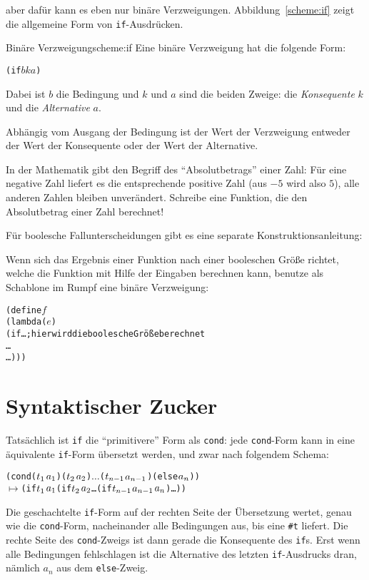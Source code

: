 aber dafür kann es eben nur binäre Verzweigungen.
Abbildung~\ref{scheme:if} zeigt die allgemeine Form von
\texttt{if}-Ausdrücken.
\begin{feature}{Binäre Verzweigung}{scheme:if}
  Eine binäre Verzweigung hat die folgende Form:
\begin{alltt}
(if \(b\) \(k\) \(a\))
\end{alltt}
Dabei ist $b$ die Bedingung und $k$ und $a$ sind die
beiden Zweige: die \textit{Konsequente} $k$ und die
\textit{Alternative} $a$.

Abhängig vom Ausgang der
Bedingung ist der Wert der Verzweigung entweder der Wert der Konsequente
oder der Wert der Alternative.
\end{feature}
%
\begin{aufgabe}
  In der Mathematik gibt den Begriff des "`Absolutbetrags"' einer
  Zahl: Für eine negative Zahl liefert es die entsprechende positive
  Zahl (aus $-5$ wird also $5$), alle anderen Zahlen bleiben
  unverändert.  Schreibe eine Funktion, die den Absolutbetrag einer
  Zahl berechnet!
\end{aufgabe}
%
Für boolesche Fallunterscheidungen gibt es eine separate
Konstruktionsanleitung:
%
\begin{konstruktionsanleitung}
  Wenn sich das Ergebnis einer Funktion nach einer booleschen Größe
  richtet, welche die Funktion mit Hilfe der Eingaben berechnen kann,
  benutze als Schablone im Rumpf eine binäre Verzweigung:
\begin{alltt}
(define \(f\)
  (lambda (\(e\))
    (if \ldots ; \textrm{hier wird die boolesche Größe berechnet}
        \ldots
        \ldots)))
\end{alltt}
\end{konstruktionsanleitung}

\section{Syntaktischer Zucker}

Tatsächlich ist \texttt{if} die "`primitivere"' Form als
\texttt{cond}: jede \texttt{cond}-Form kann in eine äquivalente
\texttt{if}-Form übersetzt werden, und zwar nach
folgendem Schema:
%
\begin{alltt}
(cond (\(t\sb{1}\) \(a\sb{1}\)) (\(t\sb{2}\) \(a\sb{2}\)) \(\ldots\) (\(t\sb{n-1}\) \(a\sb{n-1}\)) (else \(a\sb{n}\)))
  \(\mapsto\) (if \(t\sb{1}\) \(a\sb{1}\) (if \(t\sb{2}\) \(a\sb{2}\) \ldots (if \(t\sb{n-1}\) \(a\sb{n-1}\) \(a\sb{n}\))\ldots))
\end{alltt}
%
Die geschachtelte \texttt{if}-Form auf der rechten Seite der
Übersetzung wertet, genau wie die \texttt{cond}-Form, nacheinander
alle Bedingungen aus, bis eine \verb|#t| liefert.  Die rechte Seite des
\texttt{cond}-Zweigs ist dann gerade die Konsequente des \texttt{if}s.
Erst wenn alle Bedingungen fehlschlagen ist die Alternative des letzten
\texttt{if}-Ausdrucks dran, nämlich $a_n$ aus dem \texttt{else}-Zweig.

